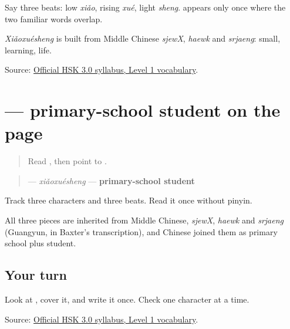 Say three beats: low \emph{xiǎo}, rising \emph{xué}, light \emph{sheng}.  appears only once where the two familiar words overlap.

\emph{Xiǎoxuésheng} is built from Middle Chinese \emph{sjewX}, \emph{haewk} and \emph{srjaeng}: small, learning, life.

\begin{tcolorbox}[breakable,colback=teal!4,colframe=teal!35!black,title={Before you move on}]
Source: \href{https://hsk.cn-bj.ufileos.com/3.0/\%E6\%96\%B0\%E7\%89\%88HSK\%E8\%80\%83\%E8\%AF\%95\%E5\%A4\%A7\%E7\%BA\%B21219.pdf}{Official HSK 3.0 syllabus, Level 1 vocabulary}.
\end{tcolorbox}
\section[\texorpdfstring{\zh{小学生} (xiǎoxuésheng)}{小学生 (xiǎoxuésheng)}]{ — primary-school student on the page}

\label{lesson:ZH-C14-xiaoxuesheng}



\begin{quote}
Read \textbf{}, then point to .
\end{quote}

\begin{cousinweb}
\begin{quote}
\textbf{} — \emph{xiǎoxuésheng} — \textbf{primary-school student}
\end{quote}

Track three characters and three beats. Read it once without pinyin.

All three pieces are inherited from Middle Chinese, \emph{sjewX}, \emph{haewk} and \emph{srjaeng} (Guangyun, in Baxter's transcription), and Chinese joined them as primary school plus student.
\end{cousinweb}

\subsection*{Your turn}
Look at \textbf{}, cover it, and write it once. Check one character at a time.

\begin{tcolorbox}[breakable,colback=teal!4,colframe=teal!35!black,title={Before you move on}]
Source: \href{https://hsk.cn-bj.ufileos.com/3.0/\%E6\%96\%B0\%E7\%89\%88HSK\%E8\%80\%83\%E8\%AF\%95\%E5\%A4\%A7\%E7\%BA\%B21219.pdf}{Official HSK 3.0 syllabus, Level 1 vocabulary}.
\end{tcolorbox}
